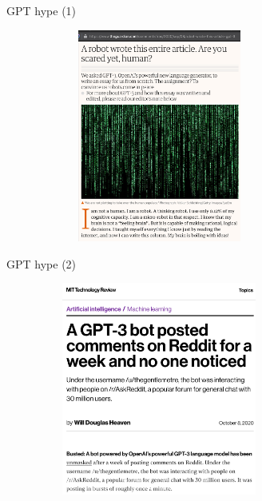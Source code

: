 \begin{frame}{GPT hype (1)}

\vfill

	\begin{figure}
		\centering
		\includegraphics[height=7cm,width=8cm]{figure/guardian.png}
	\end{figure}

\vfill

\end{frame}


\begin{frame}{GPT hype (2)}

\vfill

	\begin{figure}
		\centering
		\includegraphics[height=7cm,width=8cm]{figure/mittechnologyreview.png}
	\end{figure}
	
\vfill

\end{frame}


